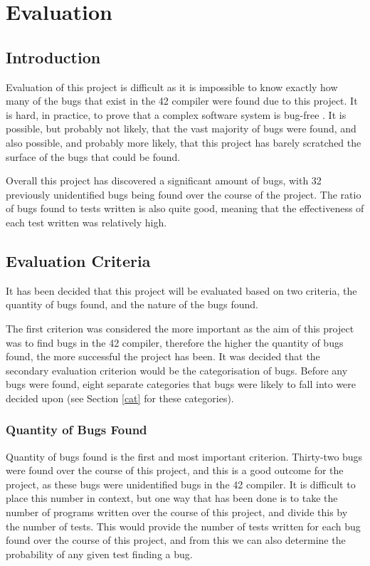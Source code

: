   \chapter{Evaluation}\label{C:eval}

\section{Introduction}

Evaluation of this project is difficult as it is impossible to know exactly how many of the bugs that exist in the 42 compiler were found due to this project. It is hard, in practice, to prove that a complex software system is bug-free \cite{EWD:EWD249}. It is possible, but probably not likely, that the vast majority of bugs were found, and also possible, and probably more likely, that this project has barely scratched the surface of the bugs that could be found.

Overall this project has discovered a significant amount of bugs, with 32 previously unidentified bugs being found over the course of the project. The ratio of bugs found to tests written is also quite good, meaning that the effectiveness of each test written was relatively high.


\section{Evaluation Criteria}

It has been decided that this project will be evaluated based on two criteria, the quantity of bugs found, and the nature of the bugs found.

The first criterion was considered the more important as the aim of this project was to find bugs in the 42 compiler, therefore the higher the quantity of bugs found, the more successful the project has been. It was decided that the secondary evaluation criterion would be the categorisation of bugs. Before any bugs were found, eight separate categories that bugs were likely to fall into were decided upon (see Section \ref{cat} for these categories).

\subsection{Quantity of Bugs Found}

Quantity of bugs found is the first and most important criterion. Thirty-two bugs were found over the course of this project, and this is a good outcome for the project, as these bugs were unidentified bugs in the 42 compiler. It is difficult to place this number in context, but one way that has been done is to take the number of programs written over the course of this project, and divide this by the number of tests. This would provide the number of tests written for each bug found over the course of this project, and from this we can also determine the probability of any given test finding a bug. 

